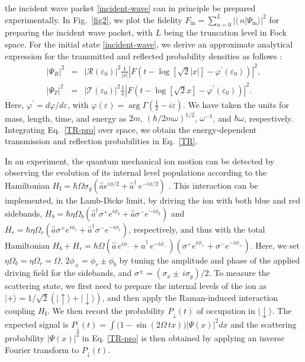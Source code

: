 \documentclass[prl,twocolumn,superscriptaddress,floatfix,showpacs,amsmath,longbibliography,nofootinbib,amssymb]{revtex4-1}
\begin{document}
the incident wave packet \eqref{incident-wave} can in principle  
be prepared experimentally. %
In Fig.~\ref{fig2}, we plot the fidelity 
$F_\text{in}=\sum^L_{n=0}|\langle\,n|\Psi_\text{in}\rangle|^2$ for preparing the incident wave packet, with $L$ being the truncation 
level in Fock space. 
For the initial state \eqref{incident-wave}, we derive an approximate analytical  expression 
for the transmitted and reflected probability densities as follows \cite{BARTON1986322}:
\begin{eqnarray}\label{TR-pro}
\nonumber
|\Psi_R|^2&=&|{\mathcal R}(\varepsilon_0)|^2\frac{1}{|x|}\left|F\left(t-\log[\sqrt{2}|x|]-\varphi^\prime(\varepsilon_0)\right)\right|^2,
\\ 
|\Psi_T|^2&=&|{\mathcal T}(\varepsilon_0)|^2\frac{1}{x}\left|F\left(t-\log[\sqrt{2}x]-\varphi^\prime(\varepsilon_0)\right)\right|^2. 
\end{eqnarray}
Here, $\varphi^\prime =d\varphi/d\varepsilon$, with  %
$\varphi(\varepsilon)=\arg\Gamma(\frac{1}{2}-i\varepsilon)$.  
We have taken the units for mass, length, time, and energy as $2m$, 
$(\hbar/2m\omega)^{1/2}$, $\omega^{-1}$, and $\hbar\omega$, respectively. 
Integrating Eq.~\eqref{TR-pro} over space, we obtain the energy-dependent transmission and reflection probabilities in Eq.~\eqref{TR}.


In an experiment, the quantum mechanical ion motion can be detected by observing the evolution of its internal level populations  
according to the Hamiltonian %
$H_\mathrm{I}=\hbar\Omega\sigma_y(\hat{a}e^{i\phi/2}+\hat{a}^\dagger\,e^{-i\phi/2})$  \cite{PhysRevLett.76.1796}. 
This interaction can be implemented, in the Lamb-Dicke limit, 
by driving the ion with both blue and red sidebands, $H_b=\hbar\eta\Omega_b(\hat{a}^\dagger\sigma^+e^{i\phi_b}+\hat{a}\sigma^-e^{-i\phi_b})$ and 
$H_r=\hbar\eta\Omega_r(\hat{a}\sigma^+e^{i\phi_r}+\hat{a}^\dagger\sigma^-e^{-i\phi_r})$, respectively, 
and thus with the total Hamiltonian  $H_b+H_r
=\hbar\Omega(\hat{a}\,e^{i\phi_-}+\hat{a}^\dagger\,e^{-i\phi_-})(\sigma^+e^{i\phi_+}+\sigma^-e^{-i\phi_+})$. Here,  
we set $\eta\Omega_b=\eta\Omega_r=\Omega$, $2\phi_\pm=\phi_r\pm\phi_b$ by tuning the amplitude and phase of the applied driving field for the sidebands, and $\sigma^\pm=(\sigma_x\pm\,i\sigma_y)/2$.
To measure the scattering state, we first need to prepare the internal levels of the ion as  
$|+\rangle=1/\sqrt{2}(|\uparrow\rangle+|\downarrow\rangle)$,
and then apply the Raman-induced interaction coupling $H_\mathrm{I}$. 
We then record the probability $P_\downarrow(t)$ of occupation in $|\downarrow\rangle$.
The expected signal is $P_\downarrow(t)=\int\big(1-\sin(2\Omega\,tx)\big)|\Psi(x)|^2dx$ and 
the scattering probability $|\Psi(x)|^2$ in Eq. \eqref{TR-pro}
is then obtained by applying an inverse Fourier transform to $P_\downarrow(t)$. 
\end{document}
